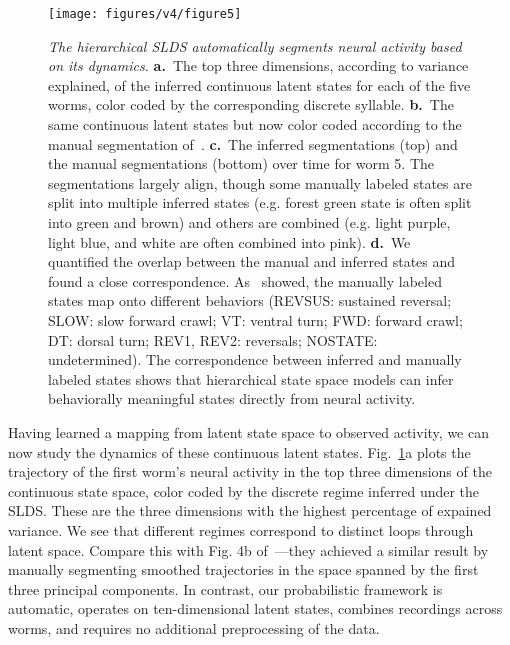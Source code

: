 \documentclass[11pt]{article}
\begin{document}
\begin{figure}[t!]
\centering
\texttt{[image: figures/v4/figure5]} 
\caption{ \textit{The hierarchical SLDS automatically segments neural
    activity based on its dynamics.}  \textbf{a.}~The top three
  dimensions, according to variance explained, of the inferred
  continuous latent states for each of the five worms, color coded by
  the corresponding discrete syllable.  \textbf{b.}~The same
  continuous latent states but now color coded according to the manual
  segmentation of~\citet{kato2015global}.  \textbf{c.}~The inferred
  segmentations (top) and the manual segmentations (bottom) over time
  for worm 5. The segmentations largely align, though some manually
  labeled states are split into multiple inferred states (e.g. forest
  green state is often split into green and brown) and others are
  combined (e.g. light purple, light blue, and white are often
  combined into pink).  \textbf{d.}~We quantified the overlap between
  the manual and inferred states and found a close correspondence.
  As~\citet{kato2015global} showed, the manually labeled states map
  onto different behaviors (\textsf{REVSUS}: sustained reversal;
  \textsf{SLOW}: slow forward crawl; \textsf{VT}: ventral turn;
  \textsf{FWD}: forward crawl; \textsf{DT}: dorsal turn; \textsf{REV1,
    REV2}: reversals; \textsf{NOSTATE}: undetermined). The
  correspondence between inferred and manually labeled states shows
  that hierarchical state space models can infer behaviorally
  meaningful states directly from neural activity.}
\label{fig:syllables}
\end{figure}

Having learned a mapping from latent state space to observed activity,
we can now study the dynamics of these continuous latent
states. Fig.~\ref{fig:syllables}a plots the trajectory of the first
worm's neural activity in the top three dimensions of the continuous
state space, color coded by the discrete regime inferred under the
SLDS.  These are the three dimensions with the highest percentage of
expained variance. We see that different regimes correspond to
distinct loops through latent space.  Compare this with Fig. 4b
of~\citet{kato2015global}---they achieved a similar result by manually
segmenting smoothed trajectories in the space spanned by the first
three principal components.  In contrast, our probabilistic framework
is automatic, operates on ten-dimensional latent states, combines
recordings across worms, and requires no additional preprocessing of
the data.
\end{document}
